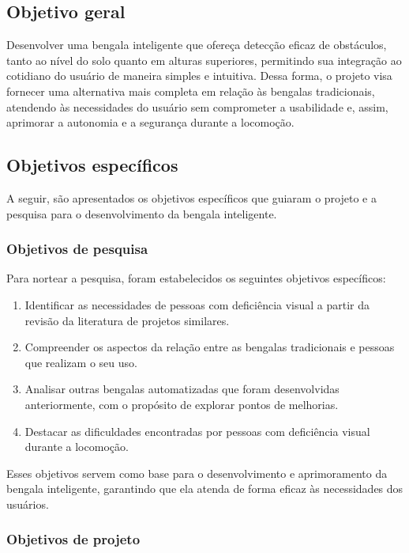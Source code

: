 \subsection{Objetivo geral}
Desenvolver uma bengala inteligente que ofereça detecção eficaz de obstáculos, tanto ao nível do solo quanto em alturas superiores, permitindo sua integração ao cotidiano do usuário de maneira simples e intuitiva. Dessa forma, o projeto visa fornecer uma alternativa mais completa em relação às bengalas tradicionais, atendendo às necessidades do usuário sem comprometer a usabilidade e, assim, aprimorar a autonomia e a segurança durante a locomoção.

\subsection{Objetivos específicos}
 A seguir, são apresentados os objetivos específicos que guiaram o projeto e a pesquisa para o desenvolvimento da bengala inteligente.

\subsubsection{Objetivos de pesquisa}

Para nortear a pesquisa, foram estabelecidos os seguintes objetivos específicos:

\begin{enumerate}
    \item Identificar as necessidades de pessoas com deficiência visual a partir da revisão da literatura de projetos similares.
    \item Compreender os aspectos da relação entre as bengalas tradicionais e pessoas que realizam o seu uso.
    \item Analisar outras bengalas automatizadas que foram  desenvolvidas anteriormente, com o propósito de explorar pontos de melhorias.
    \item Destacar as dificuldades encontradas por pessoas com deficiência visual durante a locomoção.
    
\end{enumerate}

Esses objetivos servem como base para o desenvolvimento e aprimoramento da bengala inteligente, garantindo que ela atenda de forma eficaz às necessidades dos usuários.

\subsubsection{Objetivos de projeto}

